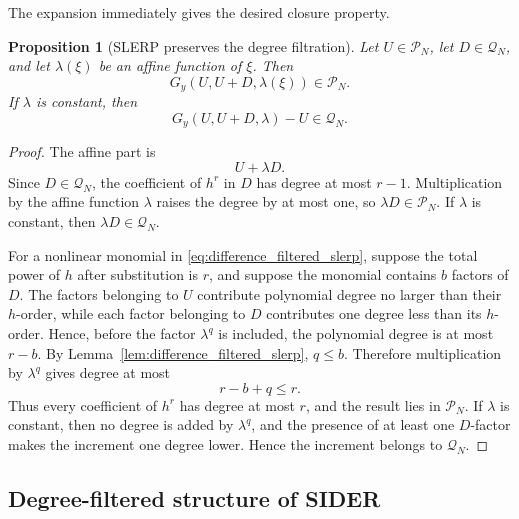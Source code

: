 \documentclass[a4paper,11pt]{article}
\newtheorem{prop}{Proposition}
\numberwithin{equation}{section}
\begin{document}
The expansion immediately gives the desired closure property.

\begin{prop}[SLERP preserves the degree filtration]
\label{prop:slerp_preserves_filter}
Let \(U\in\mathcal P_N\), let \(D\in\mathcal Q_N\), and let
\(\lambda(\xi)\) be an affine function of \(\xi\).  Then
\[
        G_y(U,U+D,\lambda(\xi))\in\mathcal P_N .
\]
If \(\lambda\) is constant, then
\[
        G_y(U,U+D,\lambda)-U\in\mathcal Q_N .
\]
\end{prop}

\begin{proof}
The affine part is
\[
        U+\lambda D .
\]
Since \(D\in\mathcal Q_N\), the coefficient of \(h^r\) in \(D\) has degree at
most \(r-1\).  Multiplication by the affine function \(\lambda\) raises the
degree by at most one, so \(\lambda D\in\mathcal P_N\).  If \(\lambda\) is
constant, then \(\lambda D\in\mathcal Q_N\).

For a nonlinear monomial in \eqref{eq:difference_filtered_slerp}, suppose the
total power of \(h\) after substitution is \(r\), and suppose the monomial
contains \(b\) factors of \(D\).  The factors belonging to \(U\) contribute
polynomial degree no larger than their \(h\)-order, while each factor belonging
to \(D\) contributes one degree less than its \(h\)-order.  Hence, before the
factor \(\lambda^q\) is included, the polynomial degree is at most \(r-b\).
By Lemma~\ref{lem:difference_filtered_slerp}, \(q\le b\).  Therefore
multiplication by \(\lambda^q\) gives degree at most
\[
        r-b+q\le r .
\]
Thus every coefficient of \(h^r\) has degree at most \(r\), and the result
lies in \(\mathcal P_N\).  If \(\lambda\) is constant, then no degree is added
by \(\lambda^q\), and the presence of at least one \(D\)-factor makes the
increment one degree lower.  Hence the increment belongs to \(\mathcal Q_N\).
\end{proof}

\subsection{Degree-filtered structure of SIDER}
\end{document}
